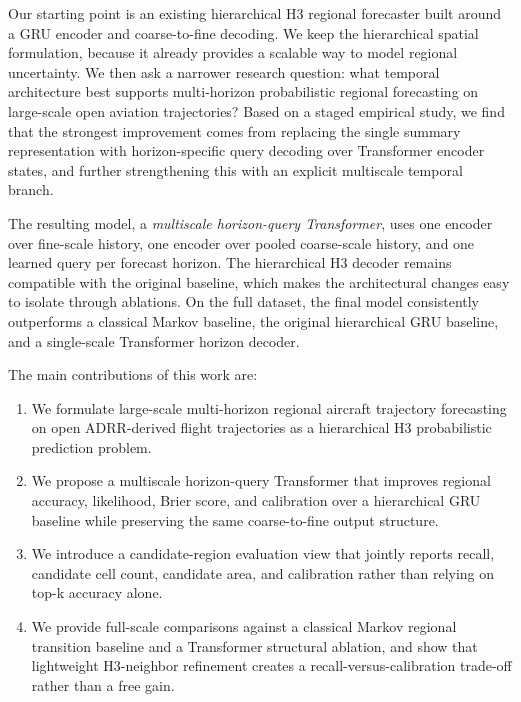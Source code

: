 Our starting point is an existing hierarchical H3 regional forecaster built around a GRU encoder and coarse-to-fine decoding. We keep the hierarchical spatial formulation, because it already provides a scalable way to model regional uncertainty. We then ask a narrower research question: what temporal architecture best supports multi-horizon probabilistic regional forecasting on large-scale open aviation trajectories? Based on a staged empirical study, we find that the strongest improvement comes from replacing the single summary representation with horizon-specific query decoding over Transformer encoder states, and further strengthening this with an explicit multiscale temporal branch.

The resulting model, a \emph{multiscale horizon-query Transformer}, uses one encoder over fine-scale history, one encoder over pooled coarse-scale history, and one learned query per forecast horizon. The hierarchical H3 decoder remains compatible with the original baseline, which makes the architectural changes easy to isolate through ablations. On the full dataset, the final model consistently outperforms a classical Markov baseline, the original hierarchical GRU baseline, and a single-scale Transformer horizon decoder.

The main contributions of this work are:
\begin{enumerate}
  \item We formulate large-scale multi-horizon regional aircraft trajectory forecasting on open ADRR-derived flight trajectories as a hierarchical H3 probabilistic prediction problem.
  \item We propose a multiscale horizon-query Transformer that improves regional accuracy, likelihood, Brier score, and calibration over a hierarchical GRU baseline while preserving the same coarse-to-fine output structure.
  \item We introduce a candidate-region evaluation view that jointly reports recall, candidate cell count, candidate area, and calibration rather than relying on top-k accuracy alone.
  \item We provide full-scale comparisons against a classical Markov regional transition baseline and a Transformer structural ablation, and show that lightweight H3-neighbor refinement creates a recall-versus-calibration trade-off rather than a free gain.
\end{enumerate}
